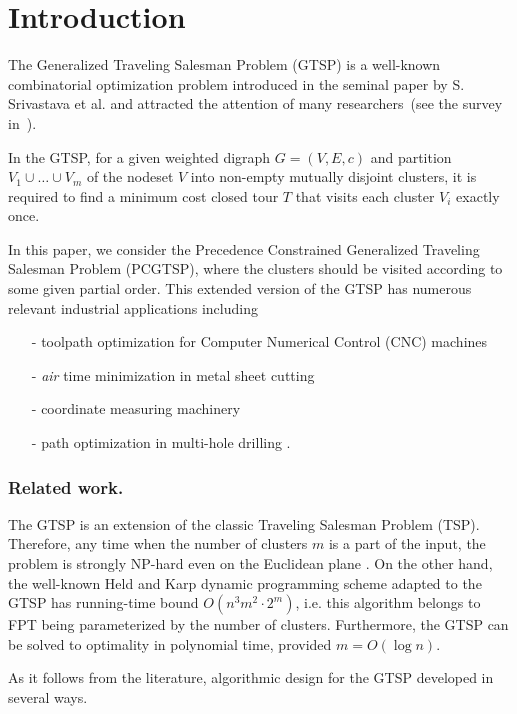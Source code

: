\section{Introduction}\label{sec:intro}
The Generalized Traveling Salesman Problem (GTSP) is a well-known combinatorial optimization problem introduced in the seminal paper \cite{SKGS1969} by S. Srivastava et al. and attracted the attention of many researchers~(see the survey in~\cite{GutinPunnen2007}). 

In the GTSP, for a given weighted digraph $G=(V,E,c)$ and partition $V_1\cup\ldots\cup V_m$ of the nodeset $V$ into non-empty mutually disjoint clusters, it is required to find a minimum cost closed tour $T$ that visits each cluster $V_i$ exactly once. 

In this paper, we consider the Precedence Constrained Generalized Traveling Salesman Problem (PCGTSP), where the clusters should be visited according to some given partial order. This extended version of the GTSP has numerous relevant industrial applications including 
\begin{itemize}
	\item[-] toolpath optimization for Computer Numerical Control (CNC) machines \cite{CASTELINO2003173}
	\item[-] \textit{air} time minimization in metal sheet cutting \cite{Petunin2018,Makarovskikh20181171}
	\item[-] coordinate measuring machinery \cite{SALMAN2016138} 
	\item[-] path optimization in multi-hole drilling \cite{DEWIL2019}.
\end{itemize}

\subsubsection{Related work.} The GTSP is an extension of the classic Traveling Salesman Problem (TSP). Therefore, any time when the number of clusters $m$ is a part of the input, the problem is strongly NP-hard even on the Euclidean plane \cite{Papa77}. On the other hand, the well-known Held and Karp dynamic programming scheme \cite{HeldKarp1962} adapted to the GTSP has running-time bound $O(n^3m^2\cdot 2^m)$, i.e. this algorithm belongs to FPT being parameterized by the number of clusters. Furthermore, the GTSP can be solved to optimality in polynomial time, provided $m=O(\log n)$.

As it follows from the literature, algorithmic design for the GTSP developed in several ways. 

